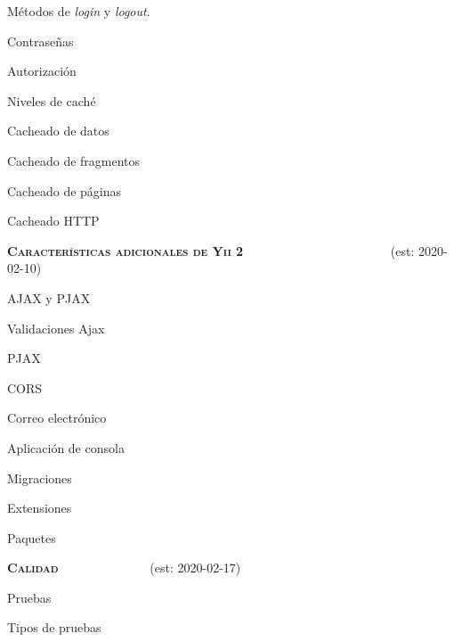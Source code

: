 \begin{longenum}
\begin{longenum}
\begin{longenum}
            \item Métodos de \textit{login} y \textit{logout}.
        \end{longenum}
        \item Contraseñas
        \item Autorización
        \item Niveles de caché
        \begin{longenum}
            \item Cacheado de datos
            \item Cacheado de fragmentos
            \item Cacheado de páginas
            \item Cacheado HTTP
        \end{longenum}
    \end{longenum}
    \item \textbf{\textsc{Características adicionales de Yii 2}} \ \ \ \ \ \ \ \ \ \ \ \ \ \ \ \ \ \ \ \ \ \ \ (est: \mbox{2020-02-10})
    \begin{longenum}
        \item AJAX y PJAX
        \begin{longenum}
            \item Validaciones Ajax
            \item PJAX \opcional\
            \item CORS \opcional\
        \end{longenum}
        \item Correo electrónico
        \item Aplicación de consola
        \item Migraciones
        \item Extensiones
        \item Paquetes
    \end{longenum}
    \item \textbf{\textsc{Calidad}} \ \ \ \ \ \ \ \ \ \ \ \ \ \ (est: \mbox{2020-02-17})
    \begin{longenum}
        \item Pruebas
        \begin{longenum}
            \item Tipos de pruebas
            \begin{longenum}

\end{longenum}
\end{longenum}
\end{longenum}
\end{longenum}
